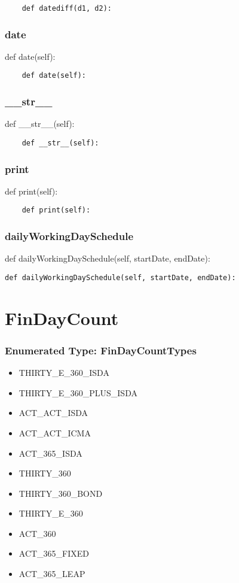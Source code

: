 \documentclass[twoside,11pt]{book}
\begin{document}
\begin{lstlisting}
    def datediff(d1, d2):
\end{lstlisting}

\subsubsection*{{\bf date}}
def date(self): 

\begin{lstlisting}
    def date(self):
\end{lstlisting}

\subsubsection*{{\bf \_\_str\_\_}}
def \_\_str\_\_(self): 

\begin{lstlisting}
    def __str__(self):
\end{lstlisting}

\subsubsection*{{\bf print}}
def print(self): 

\begin{lstlisting}
    def print(self):
\end{lstlisting}

\subsubsection*{{\bf dailyWorkingDaySchedule}}
def dailyWorkingDaySchedule(self, startDate, endDate): 

\begin{lstlisting}
def dailyWorkingDaySchedule(self, startDate, endDate):
\end{lstlisting}

\newpage
\section{FinDayCount}

\subsubsection{Enumerated Type: FinDayCountTypes}
\begin{itemize}
\item{THIRTY\_E\_360\_ISDA}
\item{THIRTY\_E\_360\_PLUS\_ISDA}
\item{ACT\_ACT\_ISDA}
\item{ACT\_ACT\_ICMA}
\item{ACT\_365\_ISDA}
\item{THIRTY\_360}
\item{THIRTY\_360\_BOND}
\item{THIRTY\_E\_360}
\item{ACT\_360}
\item{ACT\_365\_FIXED}
\item{ACT\_365\_LEAP}
\end{itemize}
\end{document}
